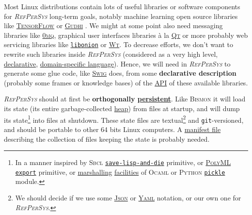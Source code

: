 \documentclass[11pt,a4paper,svgnames]{article}
\newcommand{\RefPerSys}{{\textit{\textsc{RefPerSys}}}}
\begin{document}
Most Linux distributions contain lots of useful libraries or software
components for {\RefPerSys} long-term goals, notably machine learning
open source libraries like
\href{https://www.tensorflow.org/}{\textsc{TensorFlow}}
\cite{charniak:2019:deep-learning} or
\href{https://gudhi.inria.fr/}{\textsc{Gudhi}}
\cite{chazal:2016:high}. We might at some point also need messaging
libraries like \href{https://zeromq.org/}{\textsc{0mq}}, graphical
user interfaces libraries à la \href{http://qt.io/}{\textsc{Qt}} or
more probably web servicing libraries like
\href{https://github.com/davidmoreno/onion/}{\texttt{libonion}} or
\href{https://www.webtoolkit.eu/wt}{\textsc{Wt}}. To decrease efforts,
we don't want to rewrite such libraries inside {\RefPerSys} (considered
as a very high level,
\href{https://en.wikipedia.org/wiki/Declarative\_programming}{declarative},
\href{https://en.wikipedia.org/wiki/Domain-specific\_language}{domain-specific
  language}). Hence, we will need in {\RefPerSys} to generate some
glue code, like \href{http://swig.org/}{\textsc{Swig}} does, from some
\textbf{declarative description} (probably some frames or knowledge
bases) of the
\href{https://en.wikipedia.org/wiki/Application_programming_interface}{API}
of these available libraries.

{\RefPerSys} should at first be \textbf{orthogonally
  \href{https://en.wikipedia.org/wiki/Persistence\_(computer\_science)}{persistent}}. Like
\textsc{Bismon} \cite{Starynkevitch:2019:bismon-draft} it will load
its state (its entire garbage-collected
\href{https://en.wikipedia.org/wiki/Memory\_management#HEAP}{heap})
from files at startup, and will dump its state\footnote{In a manner
inspired by \textsc{Sbcl}
\href{http://www.sbcl.org/manual/index.html\#Saving-a-Core-Image}{\texttt{save-lisp-and-die}}
primitive, or \href{https://www.polyml.org/}{\textsc{PolyML}}
\href{https://www.polyml.org/documentation/Reference/PolyMLStructure.html\#export}{\texttt{export}}
primitive, or
\href{https://en.wikipedia.org/wiki/Marshalling_(computer_science)}{marshalling}
\href{https://caml.inria.fr/pub/docs/manual-ocaml/libref/Marshal.html}{facilities} of \textsc{Ocaml} or \textsc{Python}
\href{https://docs.python.org/3/library/pickle.html}{\texttt{pickle}}
module.} into files at shutdown. These state files are
textual\footnote{We should decide if we use some
\href{http://json.org/}{\textsc{Json}} or
\href{http://yaml.org/}{\textsc{Yaml}} notation, or our own one for
\RefPerSys.} and \texttt{git}-versioned, and should be portable to
other 64 bits Linux computers. A
\href{https://en.wikipedia.org/wiki/Manifest\_file}{manifest file}
describing the collection of files keeping the state is probably
needed.
\end{document}
